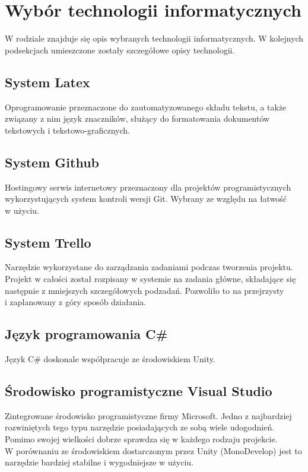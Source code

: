 \newpage\section{Wybór technologii informatycznych}
W rodziale znajduje się opis wybranych technologii informatycznych. W kolejnych podsekcjach umieszczone zostały szczegółowe opisy technologii.

\subsection{System Latex}
Oprogramowanie przeznaczone do zautomatyzowanego składu tekstu, a także związany z nim język znaczników, służący do formatowania dokumentów tekstowych i tekstowo-graficznych.

\subsection{System Github}
Hostingowy serwis internetowy przeznaczony dla projektów programistycznych wykorzystujących system kontroli wersji Git.  Wybrany ze względu na łatwość \\w użyciu.

\subsection{System Trello}
Narzędzie wykorzystane do zarządzania zadaniami podczas tworzenia projektu. Projekt w całości został rozpisany w systemie na zadania główne, składające się następnie z mniejszych szczegółowych podzadań. Pozwoliło to na przejrzysty\\ i zaplanowany z góry sposób działania.

\subsection{Język programowania C\#}
Język C\# doskonale współpracuje ze środowiskiem Unity.

\subsection{Środowisko programistyczne Visual Studio}
Zintegrowane środowisko programistyczne firmy Microsoft. Jedno z najbardziej rozwiniętych tego typu narzędzie posiadających ze sobą wiele udogodnień. \\Pomimo swojej wielkości dobrze sprawdza się w każdego rodzaju projekcie. \\W porównaniu ze środowiskiem dostarczonym przez Unity (MonoDevelop) jest to narzędzie bardziej stabilne i wygodniejsze w użyciu.

